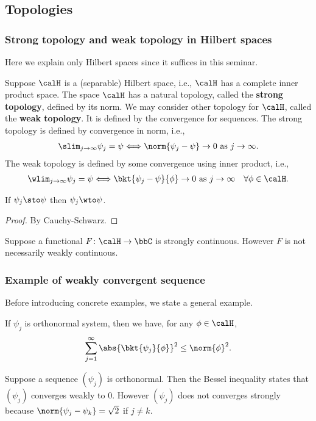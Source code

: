 \documentclass[openany, a4paper, oneside]{jsbook}
\begin{document}
\subsection{Topologies \label{Lieb-Loss_Analysis_chap11_36}}

\subsubsection{Strong topology and weak topology in Hilbert spaces}

Here we explain only Hilbert spaces since it suffices in this seminar.

Suppose $\calH$ is a (separable) Hilbert space, i.e., $\calH$ has a complete inner product space.
The space $\calH$ has a natural topology, called the \textbf{strong topology}, defined by its norm.
We may consider other topology for $\calH$, called the \textbf{weak topology}.
It is defined by the convergence for sequences.
The strong topology is defined by convergence in norm, i.e.,
\begin{align}
 \slim_{j \to \infty} \psi_j = \psi
 \Longleftrightarrow
 \norm{\psi_j - \psi} \to 0 \text{ as } j \to \infty.
\end{align}
The weak topology is defined by some convergence using inner product, i.e.,
\begin{align}
 \wlim_{j \to \infty} \psi_j = \psi
 \Longleftrightarrow
 \bkt{\psi_j - \psi}{\phi} \to 0 \text{ as } j \to \infty \quad \forall \phi \in \calH.
\end{align}
\begin{prop}
 If $\psi_j \sto \psi$ then $\psi_j \wto \psi$.
\end{prop}
\begin{proof}
By Cauchy-Schwarz.
\end{proof}
\begin{rem}
 Suppose a functional $F \colon \calH \to \bbC$ is strongly continuous.
 However $F$ is not necessarily weakly continuous.
\end{rem}

\subsubsection{Example of weakly convergent sequence}

Before introducing concrete examples, we state a general example.
\begin{thm}
 If $\psi_j$ is orthonormal system, then we have, for any $\phi \in \calH$,
 \begin{align}
  \sum_{j = 1}^{\infty} \abs{\bkt{\psi_j}{\phi}}^2
  \leq
  \norm{\phi}^2.
 \end{align}
\end{thm}
Suppose a sequence $(\psi_j)$ is orthonormal.
Then the Bessel inequality states that $(\psi_j)$ converges weakly to 0.
However $(\psi_j)$ does not converges strongly because $\norm{\psi_j - \psi_k} = \sqrt{2}$ if $j \neq k$.
\end{document}
